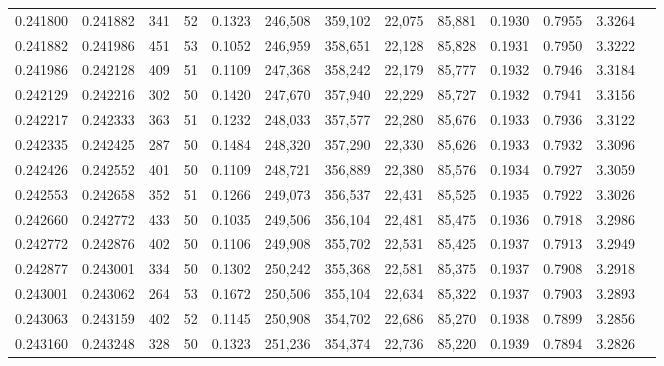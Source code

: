 \begin{tabular}{rrrrrrrrrrrrr}
0.241800 & 0.241882 &   341 &  52 &                                     0.1323 & 246,508 & 359,102 &  22,075 &  85,881 & 0.1930 & 0.7955 & 3.3264 \\
0.241882 & 0.241986 &   451 &  53 &                                     0.1052 & 246,959 & 358,651 &  22,128 &  85,828 & 0.1931 & 0.7950 & 3.3222 \\
0.241986 & 0.242128 &   409 &  51 &                                     0.1109 & 247,368 & 358,242 &  22,179 &  85,777 & 0.1932 & 0.7946 & 3.3184 \\
0.242129 & 0.242216 &   302 &  50 &                                     0.1420 & 247,670 & 357,940 &  22,229 &  85,727 & 0.1932 & 0.7941 & 3.3156 \\
0.242217 & 0.242333 &   363 &  51 &                                     0.1232 & 248,033 & 357,577 &  22,280 &  85,676 & 0.1933 & 0.7936 & 3.3122 \\
0.242335 & 0.242425 &   287 &  50 &                                     0.1484 & 248,320 & 357,290 &  22,330 &  85,626 & 0.1933 & 0.7932 & 3.3096 \\
0.242426 & 0.242552 &   401 &  50 &                                     0.1109 & 248,721 & 356,889 &  22,380 &  85,576 & 0.1934 & 0.7927 & 3.3059 \\
0.242553 & 0.242658 &   352 &  51 &                                     0.1266 & 249,073 & 356,537 &  22,431 &  85,525 & 0.1935 & 0.7922 & 3.3026 \\
0.242660 & 0.242772 &   433 &  50 &                                     0.1035 & 249,506 & 356,104 &  22,481 &  85,475 & 0.1936 & 0.7918 & 3.2986 \\
0.242772 & 0.242876 &   402 &  50 &                                     0.1106 & 249,908 & 355,702 &  22,531 &  85,425 & 0.1937 & 0.7913 & 3.2949 \\
0.242877 & 0.243001 &   334 &  50 &                                     0.1302 & 250,242 & 355,368 &  22,581 &  85,375 & 0.1937 & 0.7908 & 3.2918 \\
0.243001 & 0.243062 &   264 &  53 &                                     0.1672 & 250,506 & 355,104 &  22,634 &  85,322 & 0.1937 & 0.7903 & 3.2893 \\
0.243063 & 0.243159 &   402 &  52 &                                     0.1145 & 250,908 & 354,702 &  22,686 &  85,270 & 0.1938 & 0.7899 & 3.2856 \\
0.243160 & 0.243248 &   328 &  50 &                                     0.1323 & 251,236 & 354,374 &  22,736 &  85,220 & 0.1939 & 0.7894 & 3.2826 \\

\end{tabular}
